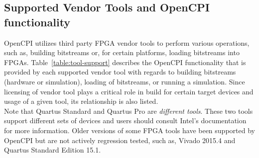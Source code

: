 \begin{flushleft}
\begin{landscape}
\section{Supported Vendor Tools and OpenCPI functionality}
\label{sec:doc_overview}
OpenCPI utilizes third party FPGA vendor tools to perform various operations, such as, building bitstreams or, for certain platforms, loading  bitstreams into FPGAs. Table~\ref{table:tool-support}
describes the OpenCPI functionality that is provided by each supported vendor tool with regards to building bitstreams (hardware or simulation), loading of bitstreams, or running a simulation. Since licensing of vendor tool plays a critical role in build for certain target devices and usage of a given tool, its relationship is also listed.\\

Note that Quartus Standard and Quartus Pro are \textit{different tools}. These two tools support different sets of devices and users should consult Intel's documentation for more information. Older versions of some FPGA tools have been supported by OpenCPI but are not actively regression tested, such as, Vivado 2015.4 and Quartus Standard Edition 15.1. \\


\end{landscape}
\end{flushleft}
